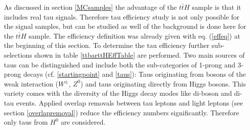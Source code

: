 %
As discussed in section \ref{MCsamples} the advantage of the $t\bar{t}H$ sample is that it includes real tau signals. Therefore tau efficiency study is not only possible for the signal samples, but can be studied as well of the background is done here for the $t\bar{t}H$ sample. The efficiency definition was already given with eq. (\ref{effeq}) at the beginning of this section. To determine the tau efficiency further sub-selections shown in table \ref{ttbarttHEffTable} are performed.\newline
Two main sources of taus can be distinguished and include both the sub-categories of 1-prong and 3-prong decays (cf. \ref{startingpoint} and \ref{taus}): Taus originating from bosons of the weak interaction ($W^\pm$, $Z^0$) and taus originating directly from Higgs bosons. This variety comes with the diversity of the Higgs decay modes like di-boson and di-tau events. Applied overlap removals between tau leptons and light leptons (see section \ref{overlapremoval}) reduce the efficiency numbers significantly. Therefore only taus from $H^0$ are considered. %
%
%
%

